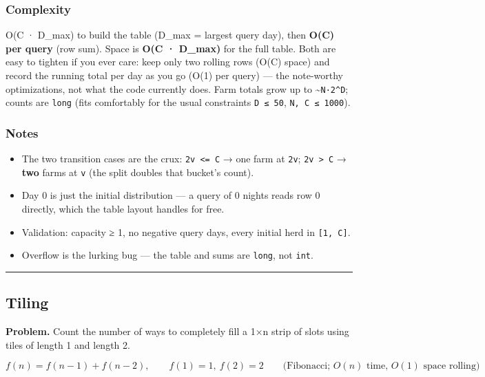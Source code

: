 \documentclass[
  10pt,
  letterpaper,
  onecolumn]{article}
\providecommand{\tightlist}{%
  \setlength{\itemsep}{0pt}\setlength{\parskip}{0pt}}
\begin{document}
\hypertarget{complexity-7}{%
\subsubsection{Complexity}\label{complexity-7}}

O(C · D\_max) to build the table (D\_max = largest query day), then
\textbf{O(C) per query} (row sum). Space is \textbf{O(C · D\_max)} for
the full table. Both are easy to tighten if you ever care: keep only two
rolling rows (O(C) space) and record the running total per day as you go
(O(1) per query) --- the note-worthy optimizations, not what the code
currently does. Farm totals grow up to
\textasciitilde{}\texttt{N·2\^{}D}; counts are \texttt{long} (fits
comfortably for the usual constraints \texttt{D\ ≤\ 50},
\texttt{N,\ C\ ≤\ 1000}).

\hypertarget{notes-5}{%
\subsubsection{Notes}\label{notes-5}}

\begin{itemize}
\tightlist
\item
  The two transition cases are the crux: \texttt{2v\ \textless{}=\ C} →
  one farm at \texttt{2v}; \texttt{2v\ \textgreater{}\ C} → \textbf{two}
  farms at \texttt{v} (the split doubles that bucket's count).
\item
  Day 0 is just the initial distribution --- a query of 0 nights reads
  row 0 directly, which the table layout handles for free.
\item
  Validation: capacity ≥ 1, no negative query days, every initial herd
  in \texttt{{[}1,\ C{]}}.
\item
  Overflow is the lurking bug --- the table and sums are \texttt{long},
  not \texttt{int}.
\end{itemize}

\begin{center}\rule{0.5\linewidth}{0.5pt}\end{center}

\hypertarget{tiling}{%
\subsection{Tiling}\label{tiling}}

\textbf{Problem.} Count the number of ways to completely fill a 1×n
strip of slots using tiles of length 1 and length 2.

\begin{equation*}
f(n)=f(n-1)+f(n-2),
\qquad f(1)=1,\ f(2)=2
\qquad\text{(Fibonacci; }O(n)\text{ time, }O(1)\text{ space rolling)}
\end{equation*}
\end{document}
